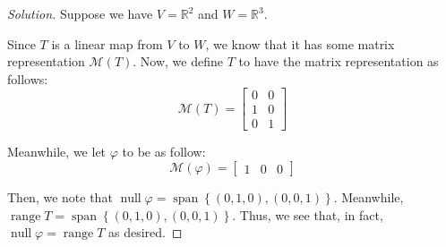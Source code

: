 \documentclass{article}
\newenvironment{solution}{\begin{proof}[Solution]}{\end{proof}}
\newcommand{\RR}{\mathbb{R}}
\DeclareMathOperator*{\vspan}{\mathrm{span}}
\DeclareMathOperator*{\vnull}{\mathrm{null}}
\DeclareMathOperator*{\vrange}{\mathrm{range}}
\begin{document}
	\begin{solution}
		Suppose we have $V = \RR^{2}$ and $W = \RR^{3}$.
		
		Since $T$ is a linear map from $V$ to $W$, we know that it has some matrix representation $\mathcal M(T)$. Now, we define $T$ to have the matrix representation as follows:
		\begin{equation*}
			\mathcal{M}(T) =
			\begin{bmatrix} 
				0 & 0 \\ 1 & 0 \\ 0 & 1
			\end{bmatrix}
		\end{equation*}
	
		Meanwhile, we let $\varphi$ to be as follow:
		\begin{equation*}
							\mathcal{M}(\varphi) = 
			\begin{bmatrix}
				1 & 0 & 0
			\end{bmatrix}
		\end{equation*}
	
		Then, we note that $\vnull \varphi = \vspan\left\{  (0,1,0), (0,0,1) \right\}$. Meanwhile, $\vrange T = \vspan\left\{  (0,1,0), (0,0,1) \right\}$. Thus, we see that, in fact, $\vnull \varphi = \vrange T$ as desired.
	\end{solution}

	\newpage
\end{document}
